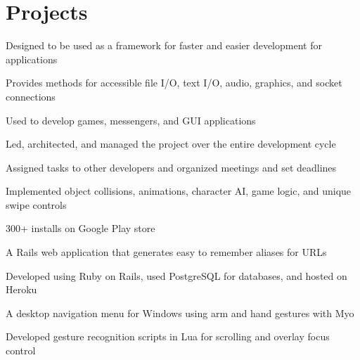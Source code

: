 \documentclass[]{peter_resume}
\begin{document}
\begin{minipage}[t]{0.66\textwidth}

\section{Projects}
\begin{tightemize}
\item Designed to be used as a framework for faster and easier development for applications
\item Provides methods for accessible file I/O, text I/O, audio, graphics, and socket connections
\item Used to develop games, messengers, and GUI applications
\end{tightemize}
\sectionsep

\begin{tightemize}
\item Led, architected, and managed the project over the entire development cycle
\item Assigned tasks to other developers and organized meetings and set deadlines
\item Implemented object collisions, animations, character AI, game logic, and unique swipe controls
\item 300+ installs on Google Play store
\end{tightemize} 
\sectionsep

\begin{tightemize}
\item A Rails web application that generates easy to remember aliases for URLs
\item Developed using Ruby on Rails, used PostgreSQL for databases, and hosted on Heroku
\end{tightemize}
\sectionsep

\begin{tightemize}
\item A desktop navigation menu for Windows using arm and hand gestures with Myo
\item Developed gesture recognition scripts in Lua for scrolling and overlay focus control
\end{tightemize} 
\sectionsep

\begin{comment}
\runsubsection{GeoChat}
\location{UofT Hacks hackathon project}
\begin{tightemize}
\item A location based social networking application for Android
\item Developed a NodeJS API and hosted on Heroku
\end{tightemize} 
\sectionsep


\end{comment}
\end{minipage}
\end{document}
